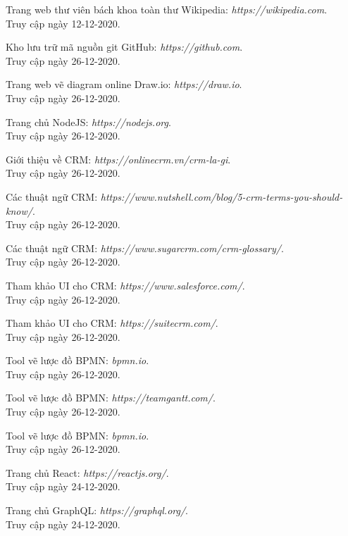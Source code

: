 \documentclass[12pt,a4paper]{article}
\begin{document}
    \newpage
    \begin{thebibliography}{80}
        Trang web thư viên bách khoa toàn thư Wikipedia: \textit{https://wikipedia.com}.\\
        Truy cập ngày 12-12-2020.

        Kho lưu trữ mã nguồn git GitHub: \textit{https://github.com}.\\
        Truy cập ngày 26-12-2020.

        Trang web vẽ diagram online Draw.io: \textit{https://draw.io}.\\
        Truy cập ngày 26-12-2020.

        Trang chủ NodeJS: \textit{https://nodejs.org}.\\
        Truy cập ngày 26-12-2020.

        Giới thiệu về CRM: \textit{https://onlinecrm.vn/crm-la-gi}.\\
        Truy cập ngày 26-12-2020.

        Các thuật ngữ CRM: \textit{https://www.nutshell.com/blog/5-crm-terms-you-should-know/}.\\
        Truy cập ngày 26-12-2020.

        Các thuật ngữ CRM: \textit{https://www.sugarcrm.com/crm-glossary/}.\\
        Truy cập ngày 26-12-2020.

        Tham khảo UI cho CRM: \textit{https://www.salesforce.com/}.\\
        Truy cập ngày 26-12-2020.

        Tham khảo UI cho CRM: \textit{https://suitecrm.com/}.\\
        Truy cập ngày 26-12-2020.

        Tool vẽ lược đồ BPMN: \textit{bpmn.io}.\\
        Truy cập ngày 26-12-2020.

        Tool vẽ lược đồ BPMN: \textit{https://teamgantt.com/}.\\
        Truy cập ngày 26-12-2020.

        Tool vẽ lược đồ BPMN: \textit{bpmn.io}.\\
        Truy cập ngày 26-12-2020.

        Trang chủ React: \textit{https://reactjs.org/}.\\
        Truy cập ngày 24-12-2020.

        Trang chủ GraphQL: \textit{https://graphql.org/}.\\
        Truy cập ngày 24-12-2020.
    \end{thebibliography}
\end{document}
